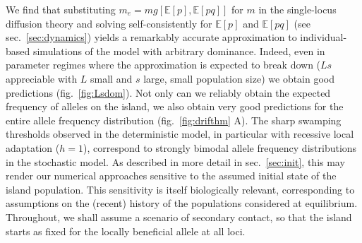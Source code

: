 \documentclass[
  11pt,
]{article}
\begin{document}
We find that substituting \(m_e = mg[\mathbb{E}[p],\mathbb{E}[pq]]\) for
\(m\) in the single-locus diffusion theory and solving self-consistently
for \(\mathbb{E}[p]\) and \(\mathbb{E}[pq]\) (see
sec.~\ref{sec:dynamics}) yields a remarkably accurate approximation to
individual-based simulations of the model with arbitrary dominance.
Indeed, even in parameter regimes where the approximation is expected to
break down (\(Ls\) appreciable with \(L\) small and \(s\) large, small
population size) we obtain good predictions (fig.~\ref{fig:Lsdom}). Not
only can we reliably obtain the expected frequency of alleles on the
island, we also obtain very good predictions for the entire allele
frequency distribution (fig.~\ref{fig:drifthm} A). The sharp swamping
thresholds observed in the deterministic model, in particular with
recessive local adaptation (\(h=1\)), correspond to strongly bimodal
allele frequency distributions in the stochastic model. As described in
more detail in sec.~\ref{sec:init}, this may render our numerical
approaches sensitive to the assumed initial state of the island
population. This sensitivity is itself biologically relevant,
corresponding to assumptions on the (recent) history of the populations
considered at equilibrium. Throughout, we shall assume a scenario of
secondary contact, so that the island starts as fixed for the locally
beneficial allele at all loci.
\end{document}
